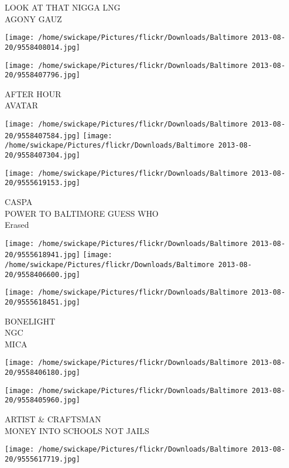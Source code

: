 \documentclass[10pt,letterpaper]{article}
\begin{document}
LOOK AT THAT NIGGA LNG\\
AGONY GAUZ\\
\pagebreak

\texttt{[image: /home/swickape/Pictures/flickr/Downloads/Baltimore 2013-08-20/9558408014.jpg]}

\vspace{0.25in}
\texttt{[image: /home/swickape/Pictures/flickr/Downloads/Baltimore 2013-08-20/9558407796.jpg]}

AFTER HOUR\\
AVATAR\\
\pagebreak

\texttt{[image: /home/swickape/Pictures/flickr/Downloads/Baltimore 2013-08-20/9558407584.jpg]}
\texttt{[image: /home/swickape/Pictures/flickr/Downloads/Baltimore 2013-08-20/9558407304.jpg]}

\vspace{0.25in}
\texttt{[image: /home/swickape/Pictures/flickr/Downloads/Baltimore 2013-08-20/9555619153.jpg]}

CASPA\\
POWER TO BALTIMORE GUESS WHO\\
Erased\\
\pagebreak

\texttt{[image: /home/swickape/Pictures/flickr/Downloads/Baltimore 2013-08-20/9555618941.jpg]}
\texttt{[image: /home/swickape/Pictures/flickr/Downloads/Baltimore 2013-08-20/9558406600.jpg]}

\texttt{[image: /home/swickape/Pictures/flickr/Downloads/Baltimore 2013-08-20/9555618451.jpg]}

BONELIGHT\\
NGC\\
MICA\\
\pagebreak

\texttt{[image: /home/swickape/Pictures/flickr/Downloads/Baltimore 2013-08-20/9558406180.jpg]}

\vspace{0.25in}
\texttt{[image: /home/swickape/Pictures/flickr/Downloads/Baltimore 2013-08-20/9558405960.jpg]}

ARTIST \& CRAFTSMAN\\
MONEY INTO SCHOOLS NOT JAILS\\
\pagebreak

\texttt{[image: /home/swickape/Pictures/flickr/Downloads/Baltimore 2013-08-20/9555617719.jpg]}
\end{document}
